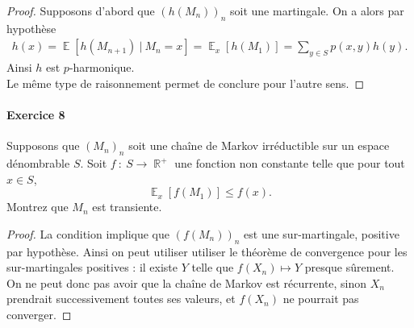 \documentclass{article}
\theoremstyle{definition}
\numberwithin{equation}{section}
\DeclareMathOperator{\R}{\mathbb{R}}
\DeclareMathOperator{\E}{\mathbb{E}}
\begin{document}
\begin{proof}
Supposons d'abord que $(h(M_n))_n$ soit une martingale. On a alors par hypothèse
\begin{align*}
h(x)=\E[h(M_{n+1})~|~M_n=x]=\E_x[h(M_1)]=\sum_{y\in S}p(x,y)h(y).
\end{align*}
Ainsi $h$ est $p$-harmonique.\\
Le même type de raisonnement permet de conclure pour l'autre sens.
\end{proof}



\paragraph{Exercice 8} 
Supposons que $(M_n)_n$ soit une chaîne de Markov irréductible sur un espace dénombrable $S$. Soit $f~:~S\to\R^+$ une fonction non constante telle que pour tout $x\in S$,
$$\E_x[f(M_1)]\leq f(x).$$
Montrez que $M_n$ est transiente.

\begin{proof}
La condition implique que $(f(M_n))_n$ est une sur-martingale, positive par hypothèse. Ainsi on peut utiliser utiliser le théorème de convergence pour les sur-martingales positives : il existe $Y$ telle que $f(X_n)\mapsto Y$ presque sûrement.\\
On ne peut donc pas avoir que la chaîne de Markov est récurrente, sinon $X_n$ prendrait successivement toutes ses valeurs, et $f(X_n)$ ne pourrait pas converger.
\end{proof}
\end{document}
